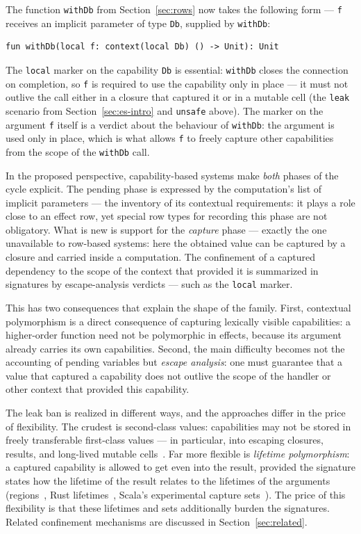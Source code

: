 \documentclass[11pt]{article}
\begin{document}
The function \lstinline|withDb| from Section~\ref{sec:rows} now takes the following
form --- \lstinline|f| receives an implicit parameter of type \lstinline|Db|, supplied
by \lstinline|withDb|:
\begin{lstlisting}[language=colang]
    fun withDb(local f: context(local Db) () -> Unit): Unit
\end{lstlisting}
The \lstinline|local| marker on the capability \lstinline|Db| is essential:
\lstinline|withDb| closes the connection on completion, so \lstinline|f| is required to
use the capability only in place --- it must not outlive the call either in a closure
that captured it or in a mutable cell (the \lstinline|leak| scenario from
Section~\ref{sec:es-intro} and \lstinline|unsafe| above). The marker on the argument
\lstinline|f| itself is a verdict about the behaviour of \lstinline|withDb|: the
argument is used only in place, which is what allows \lstinline|f| to freely capture
other capabilities from the scope of the \lstinline|withDb| call.

In the proposed perspective, capability-based systems make \emph{both} phases of the
cycle explicit. The pending phase is expressed by the computation's list of implicit
parameters --- the inventory of its contextual requirements: it plays a role close to an
effect row, yet special row types for recording this phase are not obligatory. What is
new is support for the \emph{capture} phase --- exactly the one unavailable to row-based
systems: here the obtained value can be captured by a closure and carried inside a
computation. The confinement of a captured dependency to the scope of the context that
provided it is summarized in signatures by escape-analysis verdicts --- such as the
\lstinline|local| marker.

This has two consequences that explain the shape of the family. First, contextual
polymorphism is a direct consequence of capturing lexically visible capabilities: a
higher-order function need not be polymorphic in effects, because its argument already
carries its own capabilities. Second, the main difficulty becomes not the accounting of
pending variables but \emph{escape analysis}: one must guarantee that a value that
captured a capability does not outlive the scope of the handler or other context that
provided this capability.

The leak ban is realized in different ways, and the approaches differ in the price of
flexibility. The crudest is second-class values: capabilities may not be stored
in freely transferable first-class values --- in particular, into escaping closures,
results, and long-lived mutable cells~\cite{osvald2016gentrification}. Far more flexible
is \emph{lifetime polymorphism}: a captured capability is allowed to get even into the
result, provided the signature states how the lifetime of the result relates to the
lifetimes of the arguments (regions~\cite{tofte1997region}, Rust
lifetimes~\cite{matsakis2014rust}, Scala's experimental capture
sets~\cite{boruch2023capturing}). The price of this flexibility is that these lifetimes
and sets additionally burden the signatures. Related confinement mechanisms are discussed
in Section~\ref{sec:related}.
\end{document}
